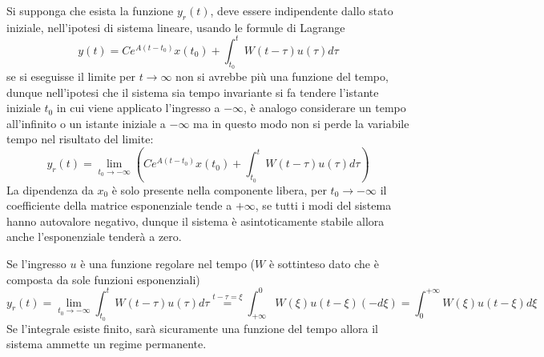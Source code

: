 Si supponga che esista la funzione $y_r(t)$, deve essere
indipendente dallo stato iniziale, nell'ipotesi di sistema lineare, usando le
formule di Lagrange
$$
y(t) = Ce^{A(t-t_0)}x(t_0)+\int_{t_0}^t
W(t-\tau)u(\tau)d\tau
$$
se si eseguisse il limite per $t\to \infty$ non si avrebbe più una funzione del
tempo, dunque nell'ipotesi che il sistema sia tempo invariante
si fa tendere l'istante iniziale $t_0$ in cui viene applicato l'ingresso a
$-\infty$, è analogo considerare un tempo all'infinito o un istante iniziale a
$-\infty$ ma in questo modo non si perde la variabile tempo nel risultato del
limite:
$$
y_r(t) = \lim_{t_0\to-\infty} \left(Ce^{A(t-t_0)}x(t_0)+\int_{t_0}^t
W(t-\tau)u(\tau)d\tau\right)
$$
La dipendenza da $x_0$ è solo presente nella componente libera, per $t_0\to
-\infty$ il coefficiente della matrice esponenziale tende a $+\infty$, se tutti
i modi del sistema hanno autovalore negativo, dunque il sistema è
asintoticamente stabile allora anche l'esponenziale tenderà a zero.

Se l'ingresso $u$ è una funzione regolare nel tempo ($W$ è sottinteso dato che
è composta da sole funzioni esponenziali)
$$
y_r(t) = \lim_{t_0\to -\infty} \int_{t_0}^t W(t-\tau) u(\tau)d\tau
\stackrel{t-\tau = \xi}{=} \int_{+\infty}^{0}W(\xi)u(t-\xi)(-d\xi) =
\int_0^{+\infty} W(\xi)u(t-\xi)d\xi
$$
Se l'integrale esiste finito, sarà sicuramente una funzione del tempo allora il
sistema ammette un regime permanente.
